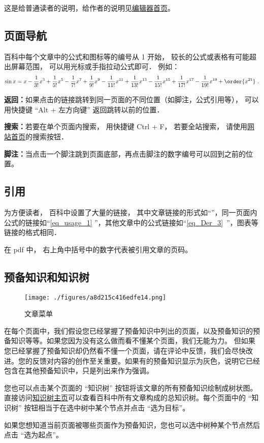 
这是给普通读者的说明，给作者的说明见\href{https://wuli.wiki/editor}{编辑器首页}。

\subsection{页面导航}
百科中每个文章中的公式和图标等的编号从 1 开始， 较长的公式或表格有可能超出屏幕范围， 可以用光标或手指拉动公式即可． 例如：
\begin{equation}\label{eq_usage_1}
\sin x = x - \frac{1}{3!} x^3 + \frac{1}{5!} x^5 - \frac{1}{7!} x^7+\frac{1}{9!} x^9-\frac{1}{11!} x^{11}+\frac{1}{13!} x^{13}-\frac{1}{15!} x^{15}+\frac{1}{17!} x^{17}-\frac{1}{19!} x^{19}+ \order{x^{21}}~.
\end{equation}

\textbf{返回：}如果点击的链接跳转到同一页面的不同位置（如脚注，公式引用等）， 可以用快捷键 “Alt + 左方向键” 返回跳转以前的位置．

\textbf{搜索：}若要在单个页面内搜索， 用快捷键 Ctrl + F， 若要全站搜索， 请使用\href{https://wuli.wiki}{网站首页}的搜索按钮．

\textbf{脚注：}当点击一个脚注跳到页面底部，再点击脚注的数字编号可以回到之前的位置。

\subsection{引用}
为方便读者， 百科中设置了大量的链接， 其中文章链接的形式如“”，同一页面内公式的链接如“\autoref{eq_usage_1} ”，其他文章中的公式链接如“\autoref{eq_Der_3}~”，图表等链接的格式相同．

在 pdf 中， 右上角中括号中的数字代表被引用文章的页码。

\subsection{预备知识和知识树}
\begin{figure}[ht]
\centering
\texttt{[image: ./figures/a8d215c416edfe14.png]}
\caption{文章菜单} \label{fig_usage_2}
\end{figure}

在每个页面中，我们假设您已经掌握了预备知识中列出的页面，以及预备知识的预备知识等等。如果您因为没有这么做而看不懂某个页面，我们无能为力。 但如果您已经掌握了预备知识却仍然看不懂一个页面，请在评论中反馈，我们会尽快改进。您的反馈对内容的创作至关重要。如果有的预备知识显示为灰色，说明它已经包含在其他预备知识中，只是列出来作为强调。

您也可以点击某个页面的 “知识树” 按钮将该文章的所有预备知识绘制成树状图。 直接访问\href{https://wuli.wiki/tree/}{知识树主页}可以查看百科中所有文章构成的总知识树。每个页面中的 “知识树” 按钮相当于在选中树中某个节点并点击 “选为目标”。

如果您想知道当前页面被哪些页面作为预备知识，您也可以选中树种某个节点然后点击 “选为起点”。
